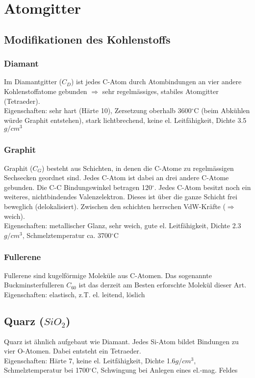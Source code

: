 \section{Atomgitter}

\subsection{Modifikationen des Kohlenstoffs}

\subsubsection{Diamant}
Im Diamantgitter ($C_D$) ist jedes C-Atom durch Atombindungen an vier andere Kohlenstoffatome gebunden $\Rightarrow$ sehr regelmässiges, stabiles Atomgitter (Tetraeder).\\
Eigenschaften: sehr hart (Härte 10), Zersetzung oberhalb 3600$^\circ$C (beim Abkühlen würde Graphit entstehen), stark lichtbrechend, keine el. Leitfähigkeit, Dichte 3.5 $g/cm^3$

\subsubsection{Graphit}
Graphit ($C_G$) besteht aus Schichten, in denen die C-Atome zu regelmässigen Sechsecken geordnet sind. Jedes C-Atom ist dabei an drei andere C-Atome gebunden. Die C-C Bindungswinkel betragen 120$^\circ$. Jedes C-Atom besitzt noch ein weiteres, nichtbindendes Valenzelektron. Dieses ist über die ganze Schicht frei beweglich (delokalisiert). Zwischen den schichten herrschen VdW-Kräfte ($\Rightarrow$ weich).\\ Eigenschaften:  metallischer Glanz, sehr weich, gute el. Leitfähigkeit, Dichte 2.3 $g/cm^3$, Schmelztemperatur ca. 3700$^\circ$C

\subsubsection{Fullerene}
Fullerene sind kugelförmige Moleküle aus C-Atomen. Das sogenannte Buckminsterfulleren $C_60$ ist das derzeit am Besten erforschte Molekül dieser Art.\\
Eigenschaften: elastisch, z.T. el. leitend, löslich

\subsection{Quarz ($SiO_2$)}
Quarz ist ähnlich aufgebaut wie Diamant. Jedes Si-Atom bildet Bindungen zu vier O-Atomen. Dabei entsteht ein Tetraeder.\\
Eigenschaften: Härte 7, keine el. Leitfähigkeit, Dichte 1.6$g/cm^3$, Schmelztemperatur bei 1700$^\circ$C, Schwingung bei Anlegen eines el.-mag. Feldes


